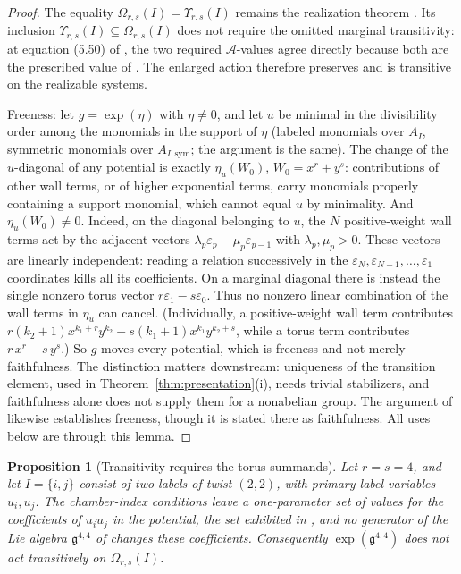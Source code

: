 \documentclass[11pt]{amsart}
\newtheorem{proposition}[theorem]{Proposition}
\theoremstyle{definition}
\theoremstyle{remark}
\newcommand{\gfrak}{\mathfrak{g}}
\newcommand{\Ascr}{\mathcal{A}}
\newcommand{\Om}{\Omega_{r,s}}
\begin{document}
\begin{proof}
The equality $\Om(I)=\Upsilon_{r,s}(I)$ remains the realization theorem
\cite[Thm.~5.13 and Cor.~5.14]{GKT}.  Its inclusion
$\Upsilon_{r,s}(I)\subseteq\Om(I)$ does not require the omitted marginal
transitivity: at equation (5.50) of \cite{GKT}, the two required
$\Ascr$-values agree directly because both are the prescribed value of
\cite[Def.~3.47]{GKT}.  The enlarged action therefore preserves and is
transitive on the realizable systems.

Freeness: let $g=\exp(\eta)$ with $\eta\ne0$, and let $u$ be minimal in the
divisibility order among the monomials in the support of $\eta$ (labeled
monomials over $A_I$, symmetric monomials over $A_{I,\mathrm{sym}}$; the
argument is the same). The change of
the $u$-diagonal of any potential is exactly $\eta_{u}(W_{0})$, $W_{0}=x^{r}+y^{s}$: contributions of
other wall terms, or of higher exponential terms, carry monomials properly
containing a support monomial, which cannot equal $u$ by minimality. And
$\eta_{u}(W_{0})\ne0$. Indeed, on the diagonal belonging to $u$, the $N$
positive-weight wall terms act by the adjacent vectors
$\lambda_{p}\varepsilon_{p}-\mu_{p}\varepsilon_{p-1}$ with $\lambda_{p},\mu_{p}>0$. These
vectors are linearly independent: reading a relation successively in the
$\varepsilon_{N},\varepsilon_{N-1},\ldots,\varepsilon_{1}$ coordinates kills all its
coefficients. On a marginal diagonal there is instead the single nonzero torus
vector $r\varepsilon_{1}-s\varepsilon_{0}$. Thus no nonzero linear combination of the wall terms in
$\eta_u$ can cancel. (Individually, a positive-weight wall term contributes
$r(k_{2}{+}1)x^{k_{1}+r}y^{k_{2}}-s(k_{1}{+}1)x^{k_{1}}y^{k_{2}+s}$, while a
torus term contributes $r\,x^{r}-s\,y^{s}$.) So $g$ moves every potential, which is freeness and not
merely faithfulness. The distinction matters downstream: uniqueness of the
transition element, used in Theorem~\ref{thm:presentation}(i), needs trivial
stabilizers, and faithfulness alone does not supply them for a nonabelian group.
The argument of \cite[Thm.~4.27, Step~2]{GKT} likewise establishes freeness,
though it is stated there as faithfulness. All uses below are through this lemma.
\end{proof}

\begin{proposition}[Transitivity requires the torus summands]
\label{prop:nontransitive}
Let $r=s=4$, and let $I=\{i,j\}$ consist of two labels of twist $(2,2)$, with
primary label variables $u_i,u_j$.  The chamber-index conditions leave a
one-parameter set of values for the coefficients of $u_iu_j$ in the
potential, the set exhibited in \cite[Ex.~4.9]{GKTsurvey}, and no generator of the
Lie algebra $\gfrak^{4,4}$ of \cite[Def.~4.23]{GKT} changes these
coefficients.  Consequently $\exp(\gfrak^{4,4})$ does not act transitively on
$\Om(I)$.
\end{proposition}
\end{document}
